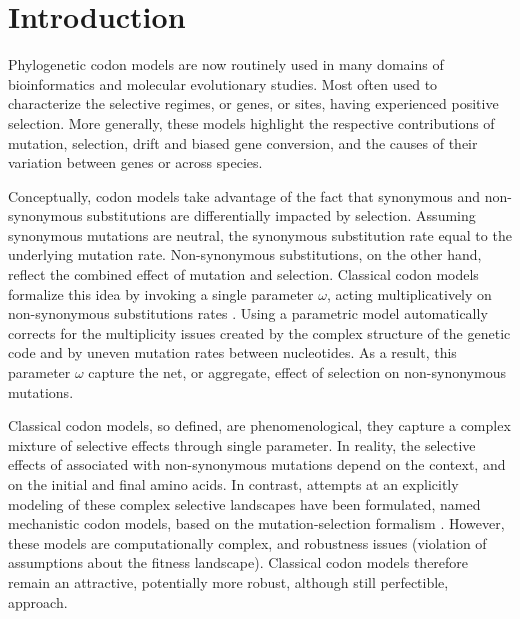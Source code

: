 
\section{Introduction}

Phylogenetic codon models are now routinely used in many domains of bioinformatics and molecular evolutionary studies.
Most often used to characterize the selective regimes, or genes, or sites, having experienced positive selection.
More generally, these models highlight the respective contributions of mutation, selection, drift and biased gene conversion, and the causes of their variation between genes or across species.

Conceptually, codon models take advantage of the fact that synonymous and non-synonymous substitutions are differentially impacted by selection.
Assuming synonymous mutations are neutral, the synonymous substitution rate equal to the underlying mutation rate.
Non-synonymous substitutions, on the other hand, reflect the combined effect of mutation and selection.
Classical codon models formalize this idea by invoking a single parameter $\omega$, acting multiplicatively on non-synonymous substitutions rates \citep{Muse1994, Goldman1994}.
Using a parametric model automatically corrects for the multiplicity issues created by the complex structure of the genetic code and by uneven mutation rates between nucleotides.
As a result, this parameter $\omega$ capture the net, or aggregate, effect of selection on non-synonymous mutations.

Classical codon models, so defined, are phenomenological, they capture a complex mixture of selective effects through single parameter.
In reality, the selective effects of associated with non-synonymous mutations depend on the context, and on the initial and final amino acids.
In contrast, attempts at an explicitly modeling of these complex selective landscapes have been formulated, named mechanistic codon models, based on the mutation-selection formalism \citep{Halpern1998}.
However, these models are computationally complex, and robustness issues (violation of assumptions about the fitness landscape).
Classical codon models therefore remain an attractive, potentially more robust, although still perfectible, approach.

